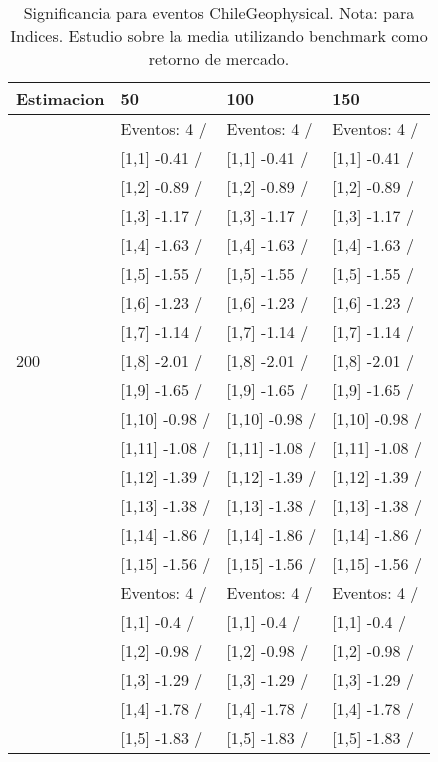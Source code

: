 \begin{table}

\caption{Significancia para eventos ChileGeophysical. Nota: para Indices. Estudio sobre la media utilizando benchmark como retorno de mercado.}
\centering
\begin{tabular}[t]{llll}
\toprule
Estimacion & 50 & 100 & 150\\
\midrule
 & Eventos:  4 / & Eventos:  4 / & Eventos:  4 /\\
 & {}[1,1] -0.41  / & {}[1,1] -0.41  / & {}[1,1] -0.41  /\\
 & {}[1,2] -0.89  / & {}[1,2] -0.89  / & {}[1,2] -0.89  /\\
 & {}[1,3] -1.17  / & {}[1,3] -1.17  / & {}[1,3] -1.17  /\\
 & {}[1,4] -1.63  / & {}[1,4] -1.63  / & {}[1,4] -1.63  /\\
\addlinespace
 & {}[1,5] -1.55  / & {}[1,5] -1.55  / & {}[1,5] -1.55  /\\
 & {}[1,6] -1.23  / & {}[1,6] -1.23  / & {}[1,6] -1.23  /\\
 & {}[1,7] -1.14  / & {}[1,7] -1.14  / & {}[1,7] -1.14  /\\
200 & {}[1,8] -2.01  / & {}[1,8] -2.01  / & {}[1,8] -2.01  /\\
 & {}[1,9] -1.65  / & {}[1,9] -1.65  / & {}[1,9] -1.65  /\\
\addlinespace
 & {}[1,10] -0.98  / & {}[1,10] -0.98  / & {}[1,10] -0.98  /\\
 & {}[1,11] -1.08  / & {}[1,11] -1.08  / & {}[1,11] -1.08  /\\
 & {}[1,12] -1.39  / & {}[1,12] -1.39  / & {}[1,12] -1.39  /\\
 & {}[1,13] -1.38  / & {}[1,13] -1.38  / & {}[1,13] -1.38  /\\
 & {}[1,14] -1.86  / & {}[1,14] -1.86  / & {}[1,14] -1.86  /\\
\addlinespace
 & {}[1,15] -1.56  / & {}[1,15] -1.56  / & {}[1,15] -1.56  /\\
 & Eventos:  4 / & Eventos:  4 / & Eventos:  4 /\\
 & {}[1,1] -0.4  / & {}[1,1] -0.4  / & {}[1,1] -0.4  /\\
 & {}[1,2] -0.98  / & {}[1,2] -0.98  / & {}[1,2] -0.98  /\\
 & {}[1,3] -1.29  / & {}[1,3] -1.29  / & {}[1,3] -1.29  /\\
\addlinespace
 & {}[1,4] -1.78  / & {}[1,4] -1.78  / & {}[1,4] -1.78  /\\
 & {}[1,5] -1.83  / & {}[1,5] -1.83  / & {}[1,5] -1.83  /\\

\end{tabular}
\end{table}
